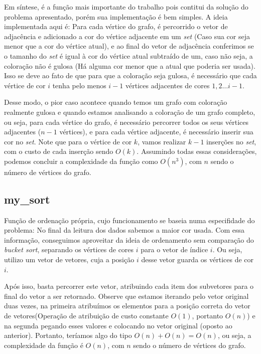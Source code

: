 \documentclass{article}
\begin{document}
Em síntese, é a função mais importante do trabalho pois contitui da solução do problema apresentado, porém sua implementação é bem simples. A ideia implementada aqui é: Para cada vértice do grafo, é percorrido o vetor de adjacência e adicionado a cor do vértice adjacente em um \emph{set} (Caso sua cor seja menor que a cor do vértice atual), e ao final do vetor de adjacência conferimos se o tamanho do \emph{set} é igual à cor do vértice atual subtraído de um, caso não seja, a coloração não é gulosa (Há alguma cor menor que a atual que poderia ser usada). 
Isso se deve ao fato de que para que a coloração seja gulosa, é necessário que cada vértice de cor $i$ tenha pelo menos $i-1$ vértices adjacentes de cores $1, 2 \dots i - 1$.

Desse modo, o pior caso acontece quando temos um grafo com coloração realmente gulosa e quando estamos analisando a coloração de um grafo completo, ou seja, para cada vértice do grafo, é necessário percorrer todos os seus vértices adjacentes ($n-1$ vértices), e para cada vértice adjacente, é necessário inserir sua cor no \emph{set}. Note que para o vértice de cor $ k $, vamos realizar $k-1$ inserções no \emph{set}, com o custo de cada inserção sendo $O(k)$. Assumindo todas essas considerações, podemos concluir a complexidade da função como $O(n^3)$, com $n$ sendo o número de vértices do grafo.

\subsection{my\_sort}
Função de ordenação própria, cujo funcionamento se baseia numa especifidade do problema: No final da leitura dos dados sabemos a maior cor usada. Com essa informação, conseguimos aproveitar da ideia de ordenamento sem comparação do \emph{bucket sort}, separando os vértices de cores $ i $ para o vetor de índice $ i $. Ou seja, utilizo um vetor de vetores, cuja a posição $ i $ desse vetor guarda os vértices de cor $ i $.

Após isso, basta percorrer este vetor, atribuindo cada item dos subvetores para o final do vetor a ser retornado. Observe que estamos iterando pelo vetor original duas vezes, na primeira atribuímos os elementos para a posição correta do vetor de vetores(Operação de atribuição de custo constante $O(1)$, portanto $O(n)$) e na segunda pegando esses valores e colocando no vetor original (oposto ao anterior). Portanto, teríamos algo do tipo $O(n) + O(n) = O(n)$, ou seja, a complexidade da função é $O(n)$, com $n$ sendo o número de vértices do grafo.
\end{document}
